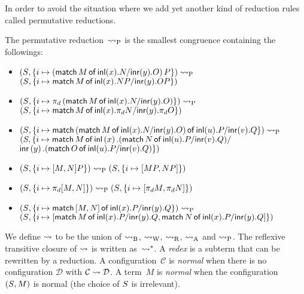 In order to avoid the situation where
we add yet another kind of reduction rules called permutative
 reductions.
\begin{definition}
 The permutative reduction~$\preduce$ is the smallest congruence
 containing the followings:
\begin{itemize}
 \small
 \item $\conf{}{\imapsto{ \left(\mat  M x N y O\right) P }}\preduce$ \\
       $\conf{}{\imapsto{ \mat M x {N P} y {O P} }}$
 \item $\conf{}{\imapsto{ \pi_d \left(\mat M x N y
       O\right)}}\preduce$\\
       $\conf{}{\imapsto{ \mat M x
       {\pi_d N} y {\pi_d O} }}$
 \item {
       $\conf{}{\imapsto{ \mat
                          {\left(\mat  M x N y O\right)}
                          u P v Q
                     } }\preduce$ \\
       $(\lstore,
       \{i\mapsto
        \mathsf{match}\,{M}\,\mathsf{of}\, \linl{x}. {
                          {\left(\mat N u P v Q\right)}
       } /$ \\ \phantom{mmmmmmmmmmm}$
       \linr{y}. {\left(\mat  O u P v Q\right)}
                      \})
       $}
 \item $\conf{}{ \imapsto{\cotuple{M, N} P} }\preduce
        \conf{}{ \imapsto{\cotuple{MP, NP} }}$
 \item $\conf{}{ \imapsto{\pi_d\cotuple{M,N} }}\preduce
        \conf{}{ \imapsto{\cotuple{\pi_d M, \pi_d N}} }$
 \item $\conf{}{ \imapsto{\mat {\cotuple{M,N}} x P y Q }}\preduce$\\
       $\conf{}{ \imapsto{\cotuple{
                          \mat  M x P y Q,
                          \mat N x P y Q
                        }} }$
\end{itemize}
\end{definition}

We define $\reduce$ to be the union of $\breduce$, $\wreduce$, $\rreduce$,
$\areduce$ and $\preduce$.
The reflexive transitive closure of $\reduce$ is
written as~$\reduction$.
A \textit{redex} is a subterm that can be rewritten by a reduction.
A configuration~$\mathcal{C}$ is \textit{normal} when
there is no configuration
$\mathcal{D}$ with $\mathcal{C}\reduce \mathcal{D}$.
A term~$M$ is \textit{normal} when the configuration $\conf{}{M}$ is
normal (the choice of $\lstore$ is irrelevant).


